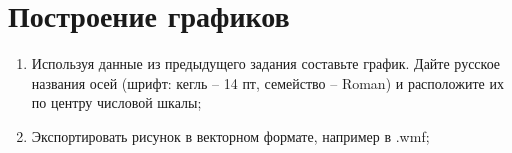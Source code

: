 \documentclass[14pt,a4paper]{article}
\begin{document}
\section{Построение графиков}
\begin{enumerate}
    \item Используя данные из предыдущего задания составьте график. Дайте русское названия осей (шрифт: кегль -- 14 пт, семейство -- Roman) и расположите их по центру числовой шкалы;
    \item Экспортировать рисунок в векторном формате, например в .wmf;
\end{enumerate}

% 
\end{document}
